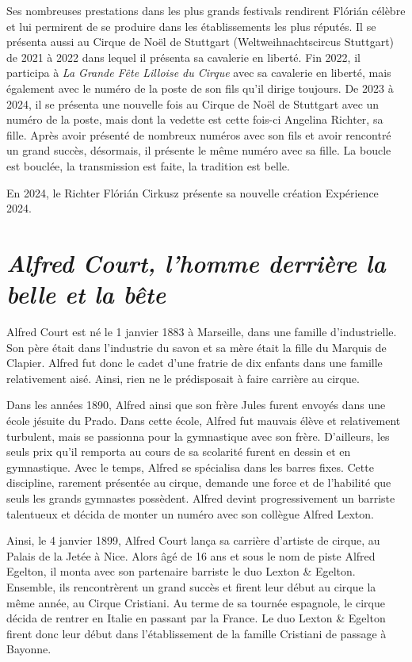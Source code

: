 Ses nombreuses prestations dans les plus grands festivals rendirent Flórián célèbre et lui permirent de se produire dans les établissements les plus réputés. Il se présenta aussi au Cirque de Noël de Stuttgart (Weltweihnachtscircus Stuttgart) de 2021 à 2022 dans lequel il présenta sa cavalerie en liberté. Fin 2022, il participa à \textit{La Grande Fête Lilloise du Cirque} avec sa cavalerie en liberté, mais également avec le numéro de la poste de son fils qu’il dirige toujours. De 2023 à 2024, il se présenta une nouvelle fois au Cirque de Noël de Stuttgart avec un numéro de la poste, mais dont la vedette est cette fois-ci Angelina Richter, sa fille. Après avoir présenté de nombreux numéros avec son fils et avoir rencontré un grand succès, désormais, il présente le même numéro avec sa fille. La boucle est bouclée, la transmission est faite, la tradition est belle. 

En 2024, le Richter Flórián Cirkusz présente sa nouvelle création Expérience 2024. 

\section*{\textit{Alfred Court, l’homme derrière la belle et la bête}}
{}
\noindent
Alfred Court est né le 1 janvier 1883 à Marseille, dans une famille d’industrielle. Son père était dans l’industrie du savon et sa mère était la fille du Marquis de Clapier. Alfred fut donc le cadet d’une fratrie de dix enfants dans une famille relativement aisé. Ainsi, rien ne le prédisposait à faire carrière au cirque.

Dans les années 1890, Alfred ainsi que son frère Jules furent envoyés dans une école jésuite du Prado. Dans cette école, Alfred fut mauvais élève et relativement turbulent, mais se passionna pour la gymnastique avec son frère. D’ail\-leurs, les seuls prix qu’il remporta au cours de sa scolarité furent en dessin et en gymnastique. Avec le temps, Alfred se spécialisa dans les barres fixes. Cette discipline, rarement présentée au cirque, demande une force et de l’habilité que seuls les grands gymnastes possèdent. Alfred devint progressivement un barriste talentueux et décida de monter un numéro avec son collègue Alfred Lexton.

Ainsi, le 4 janvier 1899, Alfred Court lança sa carrière d’artiste de cirque, au Palais de la Jetée à Nice. Alors âgé de 16 ans et sous le nom de piste Alfred Egelton, il monta avec son partenaire barriste le duo Lexton \& Egelton. Ensemble, ils rencontrèrent un grand succès et firent leur début au cirque la même année, au Cirque Cristiani. Au terme de sa tournée espagnole, le cirque décida de rentrer en Italie en passant par la France. Le duo Lexton \& Egelton firent donc leur début dans l’établissement de la famille Cristiani de passage à Bayonne.

